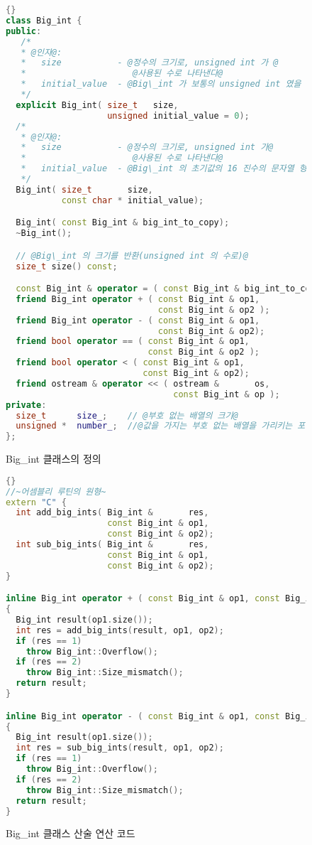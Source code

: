 \begin{figure}[tp]
\begin{lstlisting}[frame=tlrb,language=C++,escapeinside=@@]{}
class Big_int {
public:
   /* 
   * @인자@:
   *   size           - @정수의 크기로, unsigned int 가 @
   *                     @사용된 수로 나타낸다@
   *   initial_value  - @Big\_int 가 보통의 unsigned int 였을 때 초기값@
   */
  explicit Big_int( size_t   size,
                    unsigned initial_value = 0);
  /*
   * @인자@:
   *   size           - @정수의 크기로, unsigned int 가@
   *                     @사용된 수로 나타낸다@ 
   *   initial_value  - @Big\_int 의 초기값의 16 진수의 문자열 형태@
   */
  Big_int( size_t       size,
           const char * initial_value);

  Big_int( const Big_int & big_int_to_copy);
  ~Big_int();

  // @Big\_int 의 크기를 반환(unsigned int 의 수로)@
  size_t size() const;  

  const Big_int & operator = ( const Big_int & big_int_to_copy);
  friend Big_int operator + ( const Big_int & op1,
                              const Big_int & op2 );
  friend Big_int operator - ( const Big_int & op1,
                              const Big_int & op2);
  friend bool operator == ( const Big_int & op1,
                            const Big_int & op2 );
  friend bool operator < ( const Big_int & op1,
                           const Big_int & op2);
  friend ostream & operator << ( ostream &       os,
                                 const Big_int & op );
private:
  size_t      size_;    // @부호 없는 배열의 크기@
  unsigned *  number_;  //@값을 가지는 부호 없는 배열을 가리키는 포인터@
};
\end{lstlisting}
\caption{Big\_int 클래스의 정의\label{fig:BigIntClass}}
\end{figure}

\begin{figure}[tp]
\begin{lstlisting}[frame=tlrb,language=C++,escapeinside=~~]{}
//~어셈블리 루틴의 원형~
extern "C" {
  int add_big_ints( Big_int &       res, 
                    const Big_int & op1, 
                    const Big_int & op2);
  int sub_big_ints( Big_int &       res, 
                    const Big_int & op1, 
                    const Big_int & op2);
}

inline Big_int operator + ( const Big_int & op1, const Big_int & op2)
{
  Big_int result(op1.size());
  int res = add_big_ints(result, op1, op2);
  if (res == 1)
    throw Big_int::Overflow();
  if (res == 2)
    throw Big_int::Size_mismatch();
  return result;
}

inline Big_int operator - ( const Big_int & op1, const Big_int & op2)
{
  Big_int result(op1.size());
  int res = sub_big_ints(result, op1, op2);
  if (res == 1)
    throw Big_int::Overflow();
  if (res == 2)
    throw Big_int::Size_mismatch();
  return result;
}
\end{lstlisting}
\caption{Big\_int 클래스 산술 연산 코드\label{fig:BigIntAdd}}
\end{figure}

